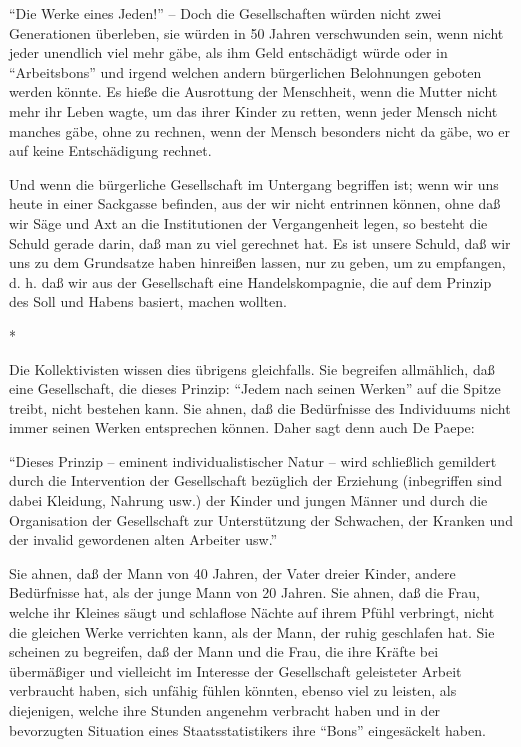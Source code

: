 \documentclass{scrbook}
\begin{document}
``Die Werke eines Jeden!'' – Doch die Gesellschaften würden nicht zwei Generationen überleben, sie würden in 50 Jahren verschwunden sein, wenn nicht jeder unendlich viel mehr gäbe, als ihm Geld entschädigt würde oder in ``Arbeitsbons'' und irgend welchen andern bürgerlichen Belohnungen geboten werden könnte. Es hieße die Ausrottung der Menschheit, wenn die Mutter nicht mehr ihr Leben wagte, um das ihrer Kinder zu retten, wenn jeder Mensch nicht manches gäbe, ohne zu rechnen, wenn der Mensch besonders nicht da gäbe, wo er auf keine Entschädigung rechnet.

Und wenn die bürgerliche Gesellschaft im Untergang begriffen ist; wenn wir uns heute in einer Sackgasse befinden, aus der wir nicht entrinnen können, ohne daß wir Säge und Axt an die Institutionen der Vergangenheit legen, so besteht die Schuld gerade darin, daß man zu viel gerechnet hat. Es ist unsere Schuld, daß wir uns zu dem Grundsatze haben hinreißen lassen, nur zu geben, um zu empfangen, d. h. daß wir aus der Gesellschaft eine Handelskompagnie, die auf dem Prinzip des Soll und Habens basiert, machen wollten.

\begin{center}*\end{center}

Die Kollektivisten wissen dies übrigens gleichfalls. Sie begreifen allmählich, daß eine Gesellschaft, die dieses Prinzip: ``Jedem nach seinen Werken'' auf die Spitze treibt, nicht bestehen kann. Sie ahnen, daß die Bedürfnisse des Individuums nicht immer seinen Werken entsprechen können. Daher sagt denn auch De Paepe:

``Dieses Prinzip – eminent individualistischer Natur – wird schließlich gemildert durch die Intervention der Gesellschaft bezüglich der Erziehung (inbegriffen sind dabei Kleidung, Nahrung usw.) der Kinder und jungen Männer und durch die Organisation der Gesellschaft zur Unterstützung der Schwachen, der Kranken und der invalid gewordenen alten Arbeiter usw.''

Sie ahnen, daß der Mann von 40 Jahren, der Vater dreier Kinder, andere Bedürfnisse hat, als der junge Mann von 20 Jahren. Sie ahnen, daß die Frau, welche ihr Kleines säugt und schlaflose Nächte auf ihrem Pfühl verbringt, nicht die gleichen Werke verrichten kann, als der Mann, der ruhig geschlafen hat. Sie scheinen zu begreifen, daß der Mann und die Frau, die ihre Kräfte bei übermäßiger und vielleicht im Interesse der Gesellschaft geleisteter Arbeit verbraucht haben, sich unfähig fühlen könnten, ebenso viel zu leisten, als diejenigen, welche ihre Stunden angenehm verbracht haben und in der bevorzugten Situation eines Staatsstatistikers ihre ``Bons'' eingesäckelt haben.
\end{document}
